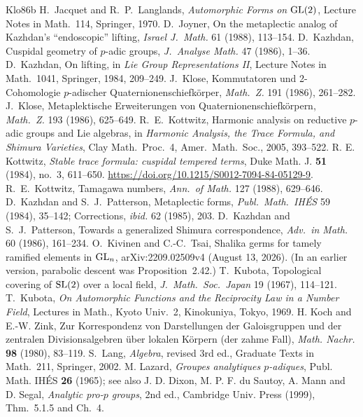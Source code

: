 \begin{thebibliography}{Klo86b}
 H.~Jacquet and R.~P.~Langlands, \emph{Automorphic Forms on $\mathrm{GL}(2)$}, Lecture Notes in Math.\ 114, Springer, 1970.
 D.~Joyner, On the metaplectic analog of Kazhdan's ``endoscopic'' lifting, \emph{Israel J.\ Math.} 61 (1988), 113--154.
 D.~Kazhdan, Cuspidal geometry of $p$-adic groups, \emph{J.\ Analyse Math.} 47 (1986), 1--36.
 D.~Kazhdan, On lifting, in \emph{Lie Group Representations II}, Lecture Notes in Math.\ 1041, Springer, 1984, 209--249.
 J.~Klose, Kommutatoren und 2-Cohomologie $p$-adischer Quaternionenschiefk\"orper, \emph{Math.\ Z.} 191 (1986), 261--282.
 J.~Klose, Metaplektische Erweiterungen von Quaternionenschiefk\"orpern, \emph{Math.\ Z.} 193 (1986), 625--649.
 R.~E.~Kottwitz, Harmonic analysis on reductive $p$-adic groups and Lie algebras, in \emph{Harmonic Analysis, the Trace Formula, and Shimura Varieties}, Clay Math.\ Proc.\ 4, Amer.\ Math.\ Soc., 2005, 393--522.
 R. E. Kottwitz, \emph{Stable trace formula: cuspidal tempered terms}, Duke Math. J. \textbf{51} (1984), no.~3, 611--650. \url{https://doi.org/10.1215/S0012-7094-84-05129-9}.
 R.~E.~Kottwitz, Tamagawa numbers, \emph{Ann.\ of Math.} 127 (1988), 629--646.
 D.~Kazhdan and S.~J.~Patterson, Metaplectic forms, \emph{Publ.\ Math.\ IH\'ES} 59 (1984), 35--142; Corrections, \emph{ibid.} 62 (1985), 203.
 D.~Kazhdan and S.~J.~Patterson, Towards a generalized Shimura correspondence, \emph{Adv.\ in Math.} 60 (1986), 161--234.
 O.~Kivinen and C.-C.~Tsai, Shalika germs for tamely ramified elements in $\mathrm{GL}_n$, arXiv:2209.02509v4 (August 13, 2026). (In an earlier version, parabolic descent was Proposition~2.42.)
 T.~Kubota, Topological covering of $\mathrm{SL}(2)$ over a local field, \emph{J.\ Math.\ Soc.\ Japan} 19 (1967), 114--121.
 T.~Kubota, \emph{On Automorphic Functions and the Reciprocity Law in a Number Field}, Lectures in Math., Kyoto Univ.\ 2, Kinokuniya, Tokyo, 1969.
 H. Koch and E.-W. Zink, Zur Korrespondenz von Darstellungen der Galoisgruppen und der zentralen Divisionsalgebren \"uber lokalen K\"orpern (der zahme Fall), \emph{Math. Nachr.} \textbf{98} (1980), 83--119.
 S.~Lang, \emph{Algebra}, revised 3rd ed., Graduate Texts in Math.\ 211, Springer, 2002.
 M. Lazard, \emph{Groupes analytiques $p$-adiques}, Publ. Math. IH\'ES \textbf{26} (1965); see also J. D. Dixon, M. P. F. du Sautoy, A. Mann and D. Segal, \emph{Analytic pro-$p$ groups}, 2nd ed., Cambridge Univ. Press (1999), Thm.~5.1.5 and Ch.~4.

\end{thebibliography}
